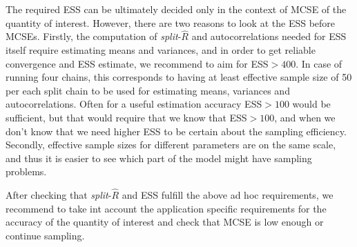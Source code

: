 \documentclass[american,]{article}
\providecommand{\tightlist}{%
  \setlength{\itemsep}{0pt}\setlength{\parskip}{0pt}}
\begin{document}
The required ESS can be ultimately decided only in the context of MCSE
of the quantity of interest. However, there are two reasons to look at
the ESS before MCSEs. Firstly, the computation of
\emph{split}-\(\widehat{R}\) and autocorrelations needed for ESS
itself require estimating means and variances, and in order to get
reliable convergence and ESS estimate, we recommend to aim for
ESS$>400$. In case of running four chains, this corresponds to having
at least effective sample size of 50 per each split chain to be used
for estimating means, variances and autocorrelations. Often for a
useful estimation accuracy ESS$>100$ would be sufficient, but that
would require that we know that ESS$>100$, and when we don't know that
we need higher ESS to be certain about the sampling efficiency.
Secondly, effective sample sizes for different parameters are on the
same scale, and thus it is easier to see which part of the model might
have sampling problems.

After checking that \emph{split}-\(\widehat{R}\) and ESS fulfill the
above ad hoc requirements, we recommend to take int account the
application specific requirements for the accuracy of the quantity of
interest and check that MCSE is low enough or continue sampling.




\end{document}
